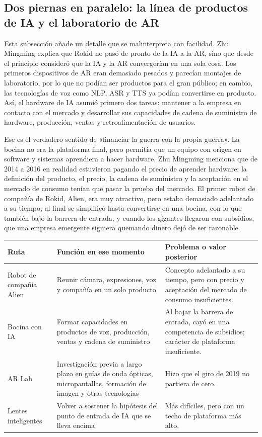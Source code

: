 \subsection{Dos piernas en paralelo: la línea de productos de IA y el laboratorio de AR}

Esta subsección añade un detalle que se malinterpreta con facilidad. Zhu Mingming explica que Rokid no pasó de pronto de la IA a la AR, sino que desde el principio consideró que la IA y la AR convergerían en una sola cosa. Los primeros dispositivos de AR eran demasiado pesados y parecían montajes de laboratorio, por lo que no podían ser productos para el gran público; en cambio, las tecnologías de voz como NLP, ASR y TTS ya podían convertirse en producto. Así, el hardware de IA asumió primero dos tareas: mantener a la empresa en contacto con el mercado y desarrollar sus capacidades de cadena de suministro de hardware, producción, ventas y retroalimentación de usuarios.

Ese es el verdadero sentido de «financiar la guerra con la propia guerra». La bocina no era la plataforma final, pero permitía que un equipo con origen en software y sistemas aprendiera a hacer hardware. Zhu Mingming menciona que de 2014 a 2016 en realidad estuvieron pagando el precio de aprender hardware: la definición del producto, el precio, la cadena de suministro y la aceptación en el mercado de consumo tenían que pasar la prueba del mercado. El primer robot de compañía de Rokid, Alien, era muy atractivo, pero estaba demasiado adelantado a su tiempo; al final se simplificó hasta convertirse en una bocina, con lo que también bajó la barrera de entrada, y cuando los gigantes llegaron con subsidios, que una empresa emergente siguiera quemando dinero dejó de ser razonable.

\noindent\begin{tabularx}{\textwidth}{p{}p{}X}
\toprule
Ruta & Función en ese momento & Problema o valor posterior \\
\midrule
Robot de compañía Alien & Reunir cámara, expresiones, voz y compañía en un solo producto & Concepto adelantado a su tiempo, pero con precio y aceptación del mercado de consumo insuficientes. \\
Bocina con IA & Formar capacidades en productos de voz, producción, ventas y cadena de suministro & Al bajar la barrera de entrada, cayó en una competencia de subsidios; carácter de plataforma insuficiente. \\
AR Lab & Investigación previa a largo plazo en guías de onda ópticas, micropantallas, formación de imagen y otras tecnologías & Hizo que el giro de 2019 no partiera de cero. \\
Lentes inteligentes & Volver a sostener la hipótesis del punto de entrada de IA que se lleva encima & Más difíciles, pero con un techo de plataforma más alto. \\
\bottomrule
\end{tabularx}

